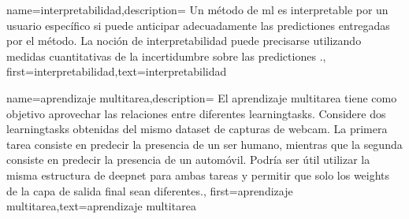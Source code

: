 {name={interpretabilidad},description=
		{Un método de \gls{ml} es interpretable  por un usuario específico si
		puede anticipar adecuadamente las \gls{prediction}es entregadas por el método. 
		La noción de interpretabilidad puede precisarse utilizando medidas cuantitativas
		de la incertidumbre sobre las \gls{prediction}es \cite{JunXML2020}.},
		first={interpretabilidad},text={interpretabilidad}
}

{name={aprendizaje multitarea},description=
	{El aprendizaje multitarea tiene como objetivo aprovechar las relaciones entre diferentes \gls{learningtask}s. 
	Considere dos \gls{learningtask}s obtenidas del mismo \gls{dataset} de capturas de webcam.
	La primera tarea consiste en predecir la presencia de un ser humano, 
	mientras que la segunda consiste en predecir la presencia de un automóvil. Podría ser útil utilizar la misma estructura de \gls{deepnet} para ambas tareas y permitir que solo los \gls{weights} 
	de la capa de salida final sean diferentes.},
	first={aprendizaje multitarea},text={aprendizaje multitarea}
}

